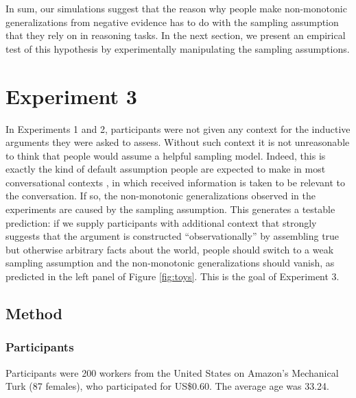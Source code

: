 \documentclass[authoryear,11pt]{elsarticle}
\begin{document}
In sum, our simulations suggest that the reason why people make non-monotonic generalizations from negative evidence has to do with the sampling assumption that they rely on in reasoning tasks. In the next section, we present an empirical test of this hypothesis by experimentally manipulating the sampling assumptions.

\section{Experiment 3}

In Experiments 1 and 2, participants were not given any context for the inductive arguments they were asked to assess. Without such context it is not unreasonable to think that people would assume a helpful sampling model. Indeed, this is exactly the kind of default assumption people are expected to make in most conversational contexts \citep{Grice1989, Levinson1995}, in which received information is taken to be relevant to the conversation. If so, the non-monotonic generalizations observed in the experiments are caused by the sampling assumption. This generates a testable prediction: if we supply participants with additional context that strongly suggests that the argument is constructed ``observationally'' by assembling true but otherwise arbitrary facts about the world, people should switch to a weak sampling assumption and the non-monotonic generalizations should vanish, as predicted in the left panel of Figure \ref{fig:toys}. This is the goal of Experiment 3.

\subsection{Method}

\subsubsection{Participants}
Participants were 200 workers from the United States on Amazon's Mechanical Turk (87 females), who participated for US\$0.60. The average age was 33.24.
\end{document}
